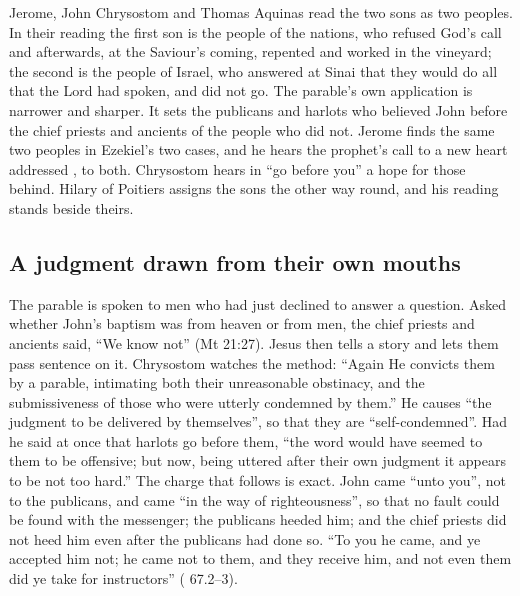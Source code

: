 \label{sec:the-publicans-go-before-you}

Jerome, John Chrysostom and Thomas Aquinas read the two sons as two peoples.
In their reading the first son is the people of the nations, who refused God's
call and afterwards, at the Saviour's coming, repented and worked in the
vineyard; the second is the people of Israel, who answered at Sinai that they
would do all that the Lord had spoken, and did not go. The parable's own
application is narrower and sharper. It sets the publicans and harlots who
believed John before the chief priests and ancients of the people who did not.
Jerome finds the same two peoples in Ezekiel's two cases, and he hears the
prophet's call to a new heart addressed , to both.
Chrysostom hears in ``go before you'' a hope for those behind.
Hilary of Poitiers assigns the sons the other way round, and his reading stands
beside theirs.

\subsection{A judgment drawn from their own mouths}

The parable is spoken to men who had just declined to answer a question. Asked
whether John's baptism was from heaven or from men, the chief priests and
ancients said, ``We know not'' (Mt 21:27). Jesus then tells a story and lets
them pass sentence on it. Chrysostom watches the method: ``Again He convicts
them by a parable, intimating both their unreasonable obstinacy, and the
submissiveness of those who were utterly condemned by them.'' He causes ``the
judgment to be delivered by themselves'', so that they are ``self-condemned''.
Had he said at once that harlots go before them, ``the word would have seemed
to them to be offensive; but now, being uttered after their own judgment it
appears to be not too hard.'' The charge that follows is exact. John came
``unto you'', not to the publicans, and came ``in the way of righteousness'', so
that no fault could be found with the messenger; the publicans heeded him; and
the chief priests did not heed him even after the publicans had done so. ``To
you he came, and ye accepted him not; he came not to them, and they receive
him, and not even them did ye take for instructors'' ( 67.2--3).

